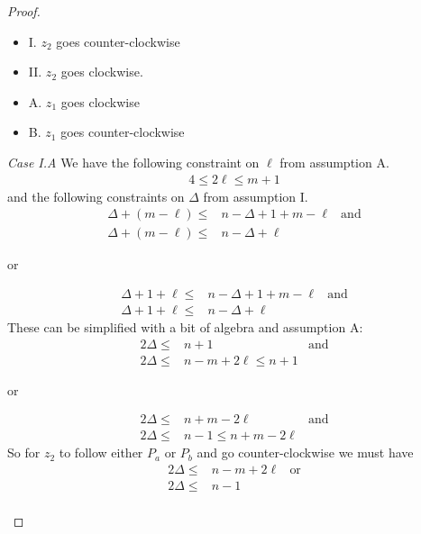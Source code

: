 \begin{proof}
\begin{description}
  \begin{itemize}
   \item I. $z_2$ goes counter-clockwise
   \item II. $z_2$ goes clockwise.
   \item A. $z_1$ goes clockwise
   \item B. $z_1$ goes counter-clockwise
  \end{itemize}

  \textit{Case I.A} We have the following constraint on $\ell$ from
  assumption A.
  \begin{align*}
   4 \leq 2 \ell \leq m + 1
  \end{align*}
  and the following constraints on $\Delta$ from assumption I.
  \begin{align*}
   \Delta + (m - \ell) \leq & n - \Delta + 1 + m - \ell & \text{and} \\
   \Delta + (m - \ell) \leq & n - \Delta + \ell
  \end{align*}
  \begin{center}or\end{center}
  \begin{align*}
   \Delta + 1 + \ell \leq & n - \Delta + 1 + m - \ell & \text{and} \\
   \Delta + 1 + \ell \leq & n - \Delta + \ell
  \end{align*}
  These can be simplified with a bit of algebra and assumption A:
  \begin{align*}
   2 \Delta \leq & n+1                    & \text{and} \\
   2 \Delta \leq & n - m + 2\ell \leq n+1
  \end{align*}
  \begin{center}or\end{center}
  \begin{align*}
   2 \Delta \leq & n+m -2 \ell             & \text{and} \\
   2 \Delta \leq & n -1 \leq n + m - 2\ell
  \end{align*}
  So for $z_2$ to follow either $P_a$ or $P_b$ and go counter-clockwise we must have
  \begin{align*}
   2 \Delta \leq & n - m + 2\ell & \text{or} \\
   2 \Delta \leq & n - 1                     \\
  \end{align*}


\end{description}
\end{proof}
